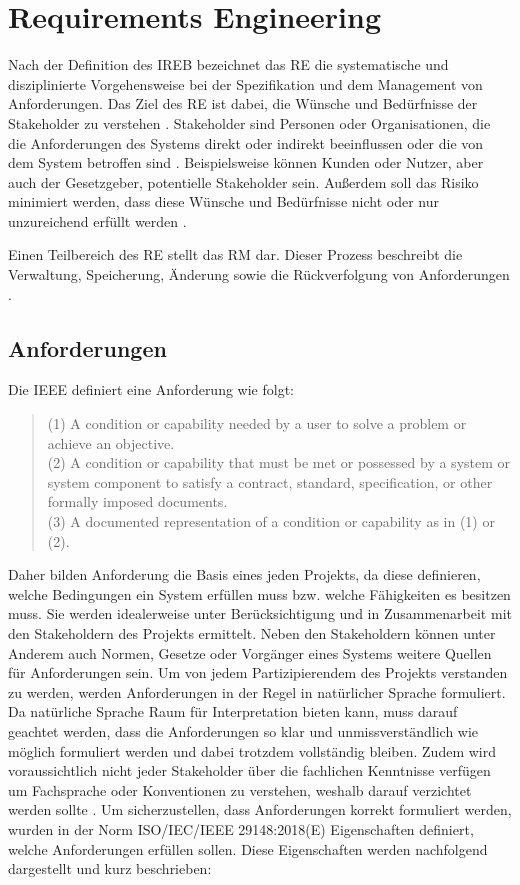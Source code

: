 \section{Requirements Engineering}
\label{chap:Requirements Engineering}
Nach der Definition des \ac{IREB} bezeichnet das \ac{RE} die systematische 
und disziplinierte Vorgehensweise bei der Spezifikation und dem Management von Anforderungen. Das Ziel des \ac{RE} ist dabei, 
die Wünsche und Bedürfnisse der Stakeholder zu verstehen \cite[vgl. S.30]{IREB_Glossary}. Stakeholder sind Personen oder Organisationen, die die 
Anforderungen des Systems direkt oder indirekt beeinflussen oder die von dem System betroffen sind \cite[vgl. S.33]{IREB_Glossary}. 
Beispielsweise können Kunden oder Nutzer, aber auch der Gesetzgeber, potentielle Stakeholder sein. Außerdem soll das Risiko minimiert werden, 
dass diese Wünsche und Bedürfnisse nicht oder nur unzureichend erfüllt werden \cite[vgl. S.30]{IREB_Glossary}.

Einen Teilbereich des \ac{RE} stellt das \ac{RM} dar. Dieser Prozess beschreibt die Verwaltung, Speicherung, 
Änderung sowie die Rückverfolgung von Anforderungen \cite[vgl. S.8]{IREB_Glossary}.

\subsection{Anforderungen}
Die IEEE definiert eine Anforderung wie folgt: 
\begin{quote}
    \glqq(1) A condition or capability needed by a user to solve a problem or achieve an objective.\\
    (2) A condition or capability that must be met
        or possessed by a system or system component to satisfy a contract, standard, specification, or other formally imposed documents.\\
    (3) A documented representation of a condition or capability as in (1) or (2).\grqq \cite[S.62]{IEEE_Glossary}
\end{quote}

Daher bilden Anforderung die Basis eines jeden Projekts, da diese definieren, welche Bedingungen ein System erfüllen muss bzw. welche Fähigkeiten 
es besitzen muss. Sie werden idealerweise unter Berücksichtigung und in Zusammenarbeit mit den Stakeholdern des Projekts ermittelt. Neben den 
Stakeholdern können unter Anderem auch Normen, Gesetze oder Vorgänger eines Systems weitere Quellen für Anforderungen sein. Um von jedem 
Partizipierendem des Projekts verstanden zu werden, werden Anforderungen in der Regel in natürlicher Sprache formuliert. Da natürliche Sprache Raum für 
Interpretation bieten kann, muss darauf geachtet werden, dass die Anforderungen so klar und unmissverständlich wie möglich formuliert werden und dabei 
trotzdem vollständig bleiben. Zudem wird voraussichtlich nicht jeder Stakeholder über die fachlichen Kenntnisse verfügen um Fachsprache oder 
Konventionen zu verstehen, weshalb darauf verzichtet werden sollte \cite[vgl. S.2]{DOORS}. Um sicherzustellen, dass Anforderungen korrekt 
formuliert werden, wurden in der Norm ISO/IEC/IEEE 29148:2018(E) Eigenschaften definiert, welche Anforderungen erfüllen sollen. 
Diese Eigenschaften werden nachfolgend dargestellt und kurz beschrieben:


